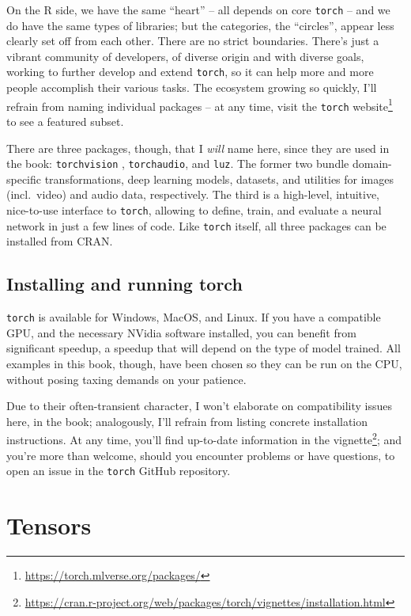 \documentclass[
  letterpaper,
]{krantz}
\DeclareRobustCommand{\href}[2]{#2\footnote{\url{#1}}}
\begin{document}
On the R side, we have the same ``heart'' -- all depends on core
\texttt{torch} -- and we do have the same types of libraries; but the
categories, the ``circles'', appear less clearly set off from each
other. There are no strict boundaries. There's just a vibrant community
of developers, of diverse origin and with diverse goals, working to
further develop and extend \texttt{torch}, so it can help more and more
people accomplish their various tasks. The ecosystem growing so quickly,
I'll refrain from naming individual packages -- at any time, visit
\href{https://torch.mlverse.org/packages/}{the \texttt{torch} website}
to see a featured subset.

There are three packages, though, that I \emph{will} name here, since
they are used in the book: \texttt{torchvision} , \texttt{torchaudio},
and \texttt{luz}. The former two bundle domain-specific transformations,
deep learning models, datasets, and utilities for images (incl.~video)
and audio data, respectively. The third is a high-level, intuitive,
nice-to-use interface to \texttt{torch}, allowing to define, train, and
evaluate a neural network in just a few lines of code. Like
\texttt{torch} itself, all three packages can be installed from CRAN.

\hypertarget{installing-and-running-torch}{%
\section{Installing and running
torch}\label{installing-and-running-torch}}

\texttt{torch} is available for Windows, MacOS, and Linux. If you have a
compatible GPU, and the necessary NVidia software installed, you can
benefit from significant speedup, a speedup that will depend on the type
of model trained. All examples in this book, though, have been chosen so
they can be run on the CPU, without posing taxing demands on your
patience.

Due to their often-transient character, I won't elaborate on
compatibility issues here, in the book; analogously, I'll refrain from
listing concrete installation instructions. At any
time, you'll find up-to-date information in the
\href{https://cran.r-project.org/web/packages/torch/vignettes/installation.html}{vignette};
and you're more than welcome, should you encounter problems or have
questions, to open an issue in the \texttt{torch} GitHub repository.

\hypertarget{sec:tensors}{%
\chapter{Tensors}\label{sec:tensors}}
\end{document}
